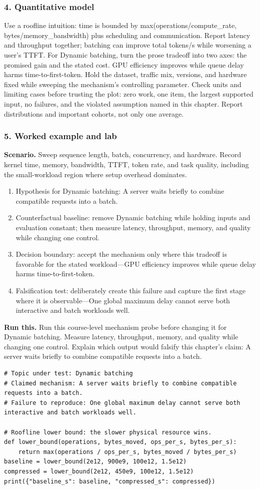 \subsubsection*{4. Quantitative model}
Use a roofline intuition: time is bounded by max(operations/compute\_rate, bytes/memory\_bandwidth) plus scheduling and communication. Report latency and throughput together; batching can improve total tokens/s while worsening a user's TTFT.
For Dynamic batching, turn the prose tradeoff into two axes: the promised gain and the stated cost. GPU efficiency improves while queue delay harms time-to-first-token. Hold the dataset, traffic mix, versions, and hardware fixed while sweeping the mechanism's controlling parameter.
Check units and limiting cases before trusting the plot: zero work, one item, the largest supported input, no failures, and the violated assumption named in this chapter. Report distributions and important cohorts, not only one average.
\subsubsection*{5. Worked example and lab}
\textbf{Scenario.} Sweep sequence length, batch, concurrency, and hardware. Record kernel time, memory, bandwidth, TTFT, token rate, and task quality, including the small-workload region where setup overhead dominates.
\begin{enumerate}
\item Hypothesis for Dynamic batching: A server waits briefly to combine compatible requests into a batch.
\item Counterfactual baseline: remove Dynamic batching while holding inputs and evaluation constant; then measure latency, throughput, memory, and quality while changing one control.
\item Decision boundary: accept the mechanism only where this tradeoff is favorable for the stated workload—GPU efficiency improves while queue delay harms time-to-first-token.
\item Falsification test: deliberately create this failure and capture the first stage where it is observable—One global maximum delay cannot serve both interactive and batch workloads well.
\end{enumerate}
\textbf{Run this.} Run this course-level mechanism probe before changing it for Dynamic batching. Measure latency, throughput, memory, and quality while changing one control. Explain which output would falsify this chapter's claim: A server waits briefly to combine compatible requests into a batch.
\begin{Verbatim}[fontsize=\scriptsize]
# Topic under test: Dynamic batching
# Claimed mechanism: A server waits briefly to combine compatible requests into a batch.
# Failure to reproduce: One global maximum delay cannot serve both interactive and batch workloads well.

# Roofline lower bound: the slower physical resource wins.
def lower_bound(operations, bytes_moved, ops_per_s, bytes_per_s):
    return max(operations / ops_per_s, bytes_moved / bytes_per_s)
baseline = lower_bound(2e12, 900e9, 100e12, 1.5e12)
compressed = lower_bound(2e12, 450e9, 100e12, 1.5e12)
print({"baseline_s": baseline, "compressed_s": compressed})
\end{Verbatim}
